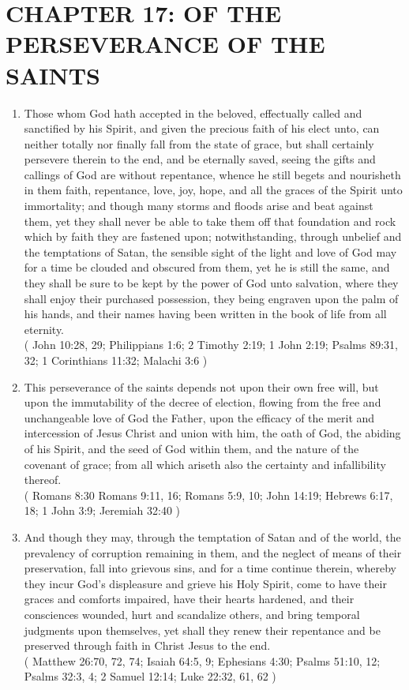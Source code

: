 \documentclass[12pt,a4paper]{book}
\begin{document}
\chapter{CHAPTER 17: OF THE PERSEVERANCE OF THE SAINTS}
\label{ch-per-sai}
\begin{enumerate}
\item Those whom God hath accepted in the beloved, effectually called and sanctified by his Spirit, and given the precious faith of his elect unto, can neither totally nor finally fall from the state of grace, but shall certainly persevere therein to the end, and be eternally saved, seeing the gifts and callings of God are without repentance, whence he still begets and nourisheth in them faith, repentance, love, joy, hope, and all the graces of the Spirit unto immortality; and though many storms and floods arise and beat against them, yet they shall never be able to take them off that foundation and rock which by faith they are fastened upon; notwithstanding, through unbelief and the temptations of Satan, the sensible sight of the light and love of God may for a time be clouded and obscured from them, yet he is still the same, and they shall be sure to be kept by the power of God unto salvation, where they shall enjoy their purchased possession, they being engraven upon the palm of his hands, and their names having been written in the book of life from all eternity.\\
( John 10:28, 29; Philippians 1:6; 2 Timothy 2:19; 1 John 2:19; Psalms 89:31, 32; 1 Corinthians 11:32; Malachi 3:6 )
\item This perseverance of the saints depends not upon their own free will, but upon the immutability of the decree of election, flowing from the free and unchangeable love of God the Father, upon the efficacy of the merit and intercession of Jesus Christ and union with him, the oath of God, the abiding of his Spirit, and the seed of God within them, and the nature of the covenant of grace; from all which ariseth also the certainty and infallibility thereof.\\
( Romans 8:30 Romans 9:11, 16; Romans 5:9, 10; John 14:19; Hebrews 6:17, 18; 1 John 3:9; Jeremiah 32:40 )
\item And though they may, through the temptation of Satan and of the world, the prevalency of corruption remaining in them, and the neglect of means of their preservation, fall into grievous sins, and for a time continue therein, whereby they incur God's displeasure and grieve his Holy Spirit, come to have their graces and comforts impaired, have their hearts hardened, and their consciences wounded, hurt and scandalize others, and bring temporal judgments upon themselves, yet shall they renew their repentance and be preserved through faith in Christ Jesus to the end.\\
( Matthew 26:70, 72, 74; Isaiah 64:5, 9; Ephesians 4:30; Psalms 51:10, 12; Psalms 32:3, 4; 2 Samuel 12:14; Luke 22:32, 61, 62 )
\end{enumerate}
\end{document}
